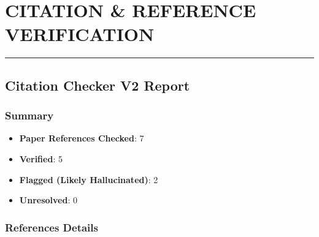\documentclass[11pt,a4paper]{article}
\begin{document}
\section*{CITATION \& REFERENCE VERIFICATION}
\par\medskip\noindent\rule{\linewidth}{0.4pt}\medskip\par
\subsection*{Citation Checker V2 Report}
\subsubsection*{Summary}
\begin{itemize}[leftmargin=1.8em,itemsep=2pt]
\item \textbf{Paper References Checked}: 7
\item \textbf{Verified}: 5
\item \textbf{Flagged (Likely Hallucinated)}: 2
\item \textbf{Unresolved}: 0
\end{itemize}
\subsubsection*{References Details}
\end{document}
